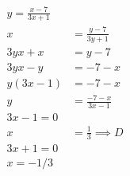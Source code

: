 \documentclass[openany, draft]{book}
\begin{document}
\frontmatter
\tableofcontents
\clearpage

\mainmatter



\begin{align}
    y = \frac{x-7}{3x+1} \\ x &= \frac{y-7}{3y+1} \\ 3yx +x &= y-7 \\ 3yx -y &= -7-x \\ y(3x -1) &= -7-x \\ y &= \frac{-7-x}{3x-1} \\
    3x-1 = 0 \\ x&=\frac{1}{3} \implies D \\
    3x+1 =0 \\ x=-1/3 \\
\end{align}

\begin{align}
\end{align}

\end{document}
